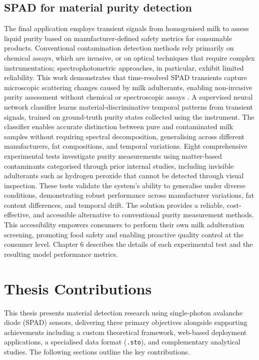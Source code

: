 \documentclass[12pt,a4paper,oneside]{report}
\let\oldsection\section
\renewcommand{\section}{\clearpage\oldsection}
\begin{document}
\subsection{SPAD for material purity detection}
\label{subsec:spad_purity_detection}
The final application employs transient signals from homogenised milk to assess liquid purity based on manufacturer-defined safety metrics for consumable products. Conventional contamination detection methods rely primarily on chemical assays, which are invasive, or on optical techniques that require complex instrumentation; spectrophotometric approaches, in particular, exhibit limited reliability. This work demonstrates that time-resolved SPAD transients capture microscopic scattering changes caused by milk adulterants, enabling non-invasive purity assessment without chemical or spectroscopic assays \cite{nielsen2013,gregory1961}. A supervised neural network classifier learns material-discriminative temporal patterns from transient signals, trained on ground-truth purity states collected using the instrument. The classifier enables accurate distinction between pure and contaminated milk samples without requiring spectral decomposition, generalising across different manufacturers, fat compositions, and temporal variations. Eight comprehensive experimental tests investigate purity measurements using matter-based contaminants categorised through prior internal studies, including invisible adulterants such as hydrogen peroxide that cannot be detected through visual inspection. These tests validate the system's ability to generalise under diverse conditions, demonstrating robust performance across manufacturer variations, fat content differences, and temporal drift. The solution provides a reliable, cost-effective, and accessible alternative to conventional purity measurement methods. This accessibility empowers consumers to perform their own milk adulteration screening, promoting food safety and enabling proactive quality control at the consumer level. Chapter 6 describes the details of each experimental test and the resulting model performance metrics.

\newpage
\section{Thesis Contributions}
\label{sec:thesis_contributions}

This thesis presents material detection research using single-photon avalanche diode (SPAD) sensors, delivering three primary objectives alongside supporting achievements including a custom theoretical framework, web-based deployment applications, a specialised data format (\texttt{.sto}), and complementary analytical studies. The following sections outline the key contributions.
\end{document}
